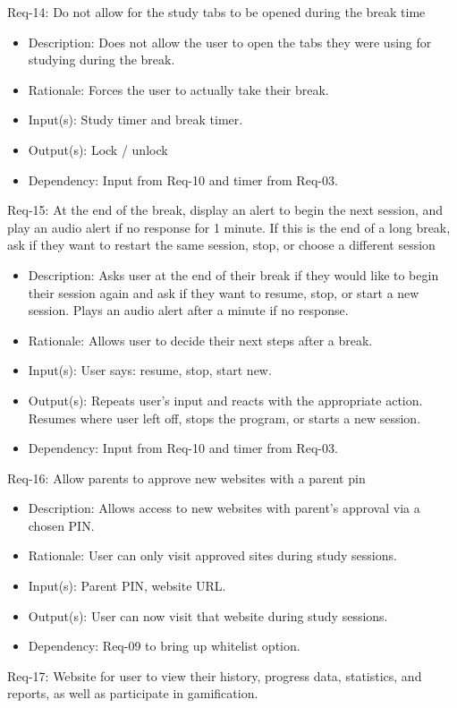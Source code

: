 \documentclass[12pt]{article}
\begin{document}
Req-14: Do not allow for the study tabs to be opened during the break time
\begin{itemize}
    \item Description: Does not allow the user to open the tabs they were using for studying during the break.
    \item Rationale: Forces the user to actually take their break.
    \item Input(s): Study timer and break timer.
    \item Output(s): Lock / unlock
    \item Dependency: Input from Req-10 and timer from Req-03.
\end{itemize}
Req-15: At the end of the break, display an alert to begin the next session, and play an audio alert if no response for 1 minute. If this is the end of a long break, ask if they want to restart the same session, stop, or choose a different session
\begin{itemize}
    \item Description:  Asks user at the end of their break if they would like to begin their session again and ask if they want to resume, stop, or start a new session. Plays an audio alert after a minute if no response.
    \item Rationale: Allows user to decide their next steps after a break.
    \item Input(s): User says: resume, stop, start new. 
    \item Output(s): Repeats user’s input and reacts with the appropriate action. Resumes where user left off, stops the program, or starts a new session.
    \item Dependency:  Input from Req-10 and timer from Req-03.
\end{itemize}
Req-16: Allow parents to approve new websites with a parent pin
\begin{itemize}
    \item Description: Allows access to new websites with parent’s approval via a chosen PIN.
    \item Rationale: User can only visit approved sites during study sessions.
    \item Input(s): Parent PIN, website URL.
    \item Output(s): User can now visit that website during study sessions.
    \item Dependency: Req-09 to bring up whitelist option.
\end{itemize}
Req-17: Website for user to view their history, progress data, statistics, and reports, as well as participate in gamification.
\end{document}
